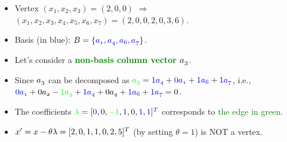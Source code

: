 \documentclass[mathserif]{beamer}
\begin{document}
{\begin{scriptsize}

\begin{itemize}
 \item Vertex  $(x_1,x_2,x_3)=(2,0, 0)$ $\Rightarrow$ $(x_1,x_2,x_3,x_4,x_5,x_6,x_7) = ( 2, 0, 0, 2, 0, 3, 6 )$.
  \item Basis (in blue): $\mathnormal{B =\{ \textcolor{blue}{a_1, a_4, a_6, a_7} \} }$.
 \item  Let's consider a \textcolor{green}{\bf non-basis column vector $\mathnormal{a_3}$}. 
 \item  Since $\mathnormal{a_3}$ can be decomposed as  $\mathnormal{ \textcolor{green}{a_{3}} }=   \textcolor{blue}{1 \mathnormal{a_{4}} } + \textcolor{blue}{0 \mathnormal{a_{1}} }  + \textcolor{blue}{1 \mathnormal{a_{6}} }   + \textcolor{blue}{1 \mathnormal{a_{7}}}$, i.e., 
 $\textcolor{blue}{0 \mathnormal{a_{1}} }  +  \textcolor{black}{0 \mathnormal{a_{2}} } -  \textcolor{green}{1 \mathnormal{a_{3}} }  +  \textcolor{blue}{1 \mathnormal{a_{4}} } +  \textcolor{black}{0 \mathnormal{a_{4}} } + \textcolor{blue}{1 \mathnormal{a_{6}} }   + \textcolor{blue}{1 \mathnormal{a_{7}}} = 0$.
  \item The coefficients   $ \textcolor{green} { \mathnormal{\lambda}} = [ \textcolor{blue}{0}, 0, \textcolor{green}{-1},  \textcolor{blue}{1}, 0,  \textcolor{blue}{1},  \textcolor{blue}{1} ]^T$ corresponds to \textcolor{green}{the  edge in green}. 
  \item $\mathnormal{x'=x-\theta \lambda} = [ 2,0,1,1,0,2,5]^T$ (by setting $\theta=1$) is NOT a vertex.
\end{itemize}
\end{scriptsize}
}
\end{document}
